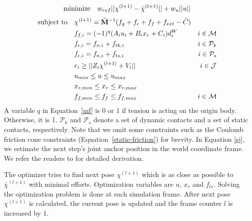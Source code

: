 \documentclass[master,english,final]{kaist-ucs}
\begin{document}
\begin{equation}\notag
\text{minimize} \quad w_{ref} || \chi^{(l+1)} - \bar{\chi}^{(l+1)} || + w_u || u ||
\end{equation}
\begin{align}
\text{subject to} & \quad \chi^{(l+1)} = \tilde{\mathbf{M}}^{-1} (f_g + f_c + f_f + f_{ext} - \tilde{C})     &                      \label{moeq-dis}\\
                  & \quad f_{f,i} = (-1)^{q} ( A_i u_i + B_i x_r + C_i ) d^W_i                               & i \in \mathcal{M}    \label{mf}\\
                  & \quad f_{c,i} = f_{n,i} + f_{tk, i}                                                      & i \in \mathcal{P}_k  \notag\\
                  & \quad f_{c,i} = f_{n,i} + f_{ts, i}                                                      & i \in \mathcal{P}_s  \notag\\
                  & \quad r_i \geq || Z_i \chi^{(l+1)} + V_i ||                                              & i \in \mathcal{J}    \label{sj}\\
                  & \quad u_{min}   \leq u   \leq u_{max}                                                    &                      \notag\\
                  & \quad x_{r,min} \leq x_r \leq x_{r,max}                                                  &                      \notag\\
                  & \quad f_{f,min} \leq f_f \leq f_{f,max}                                                  & i \in \mathcal{M}    \notag
\end{align}
A variable $q$ in Equation~\eqref{mf} is 0 or 1
if tension is acting on the origin body. Otherwise, it is 1.
$\mathcal{P}_k$ and $\mathcal{P}_s$ denote a set of dynamic contacts and a set of static contacts, respectively.
Note that we omit some constraints such as the Coulomb friction cone constraints (Equation~\eqref{static-friction}) for brevity.
In Equation \eqref{sj}, we estimate the next step's joint anchor position in the world coordinate frame.
We refer the readers to \cite{Jain:09:OIM} for detailed derivation.

The optimizer tries to find next pose $\chi^{(l+1)}$ which is as close as possible
to $\bar{\chi}^{(l+1)}$ with minimal efforts.
Optimization variables are $u$, $x_r$ and $f_{ts}$.
Solving the optimization problem is done at each simulation frame.
After next pose $\chi^{(l+1)}$ is calculated, the current pose is updated
and the frame counter $l$ is increased by 1.
\end{document}
